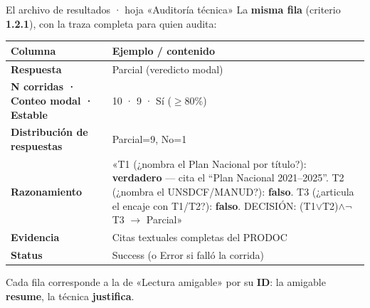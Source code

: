 \documentclass[aspectratio=169,11pt]{beamer}
\newcommand{\bluelead}[1]{\textbf{\color{iloBlue}#1}}
\begin{document}
\begin{frame}{El archivo de resultados · hoja «Auditoría técnica»}
  \small
  La \bluelead{misma fila} (criterio \bluelead{1.2.1}), con la traza completa para quien audita:
  \vspace{0.12cm}
  \renewcommand{\arraystretch}{1.1}
  \begin{tabular}{@{}p{4.3cm}p{7.9cm}@{}}
    \toprule
    \rowcolor{iloBlue}\color{white}\textbf{Columna} & \color{white}\textbf{Ejemplo / contenido}\\
    \midrule
    \bluelead{Respuesta} & Parcial (veredicto modal)\\
    \rowcolor{iloGrayLt}\bluelead{N corridas · Conteo modal · Estable} & 10 · 9 · Sí ($\geq$80\%)\\
    \bluelead{Distribución de respuestas} & Parcial=9, No=1\\
    \bluelead{Razonamiento} & «T1 (¿nombra el Plan Nacional por título?): \textbf{verdadero} — cita el ``Plan Nacional 2021–2025''. \newline T2 (¿nombra el UNSDCF/MANUD?): \textbf{falso}. \newline T3 (¿articula el encaje con T1/T2?): \textbf{falso}. \newline DECISIÓN: (T1$\vee$T2)$\wedge\neg$T3 $\to$ Parcial»\\
    \rowcolor{iloGrayLt}\bluelead{Evidencia} & Citas textuales completas del PRODOC\\
    \bluelead{Status} & Success (o Error si falló la corrida)\\
    \bottomrule
  \end{tabular}
  \vspace{0.12cm}\par
  {\footnotesize Cada fila corresponde a la de «Lectura amigable» por su \textbf{ID}: la amigable \bluelead{resume}, la técnica \bluelead{justifica}.}
\end{frame}

\end{document}
